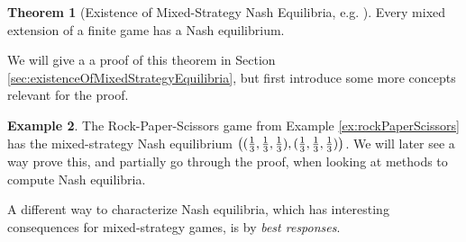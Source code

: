 \documentclass[a4paper,DIV=11]{scrreprt}
\theoremstyle{definition}
\newtheorem{thm}{Theorem}[chapter] %
\newtheorem{ex}[thm]{Example} %
\begin{document}
    \begin{thm}[Existence of Mixed-Strategy Nash Equilibria, e.g. {\cite[Section 1.3.1]{bib:fudenbergGameTheory}}]
        Every mixed extension of a finite game has a Nash equilibrium.
        \label{thm:existenceOfMixedStrategyEquilibria}
    \end{thm}
    We will give a a proof of this theorem in Section \ref{sec:existenceOfMixedStrategyEquilibria}, but first introduce some more concepts relevant for the proof.
    
    \begin{ex}
        The Rock-Paper-Scissors game from Example \ref{ex:rockPaperScissors}
        has the mixed-strategy Nash equilibrium $\bigl((\frac{1}{3}, \frac{1}{3}, \frac{1}{3}), (\frac{1}{3}, \frac{1}{3}, \frac{1}{3})\bigr)$.
        We will later see a way prove this, and partially go through the proof, when looking at methods to compute Nash equilibria.
    \end{ex}
    
    A different way to characterize Nash equilibria, which has interesting consequences for mixed-strategy games, is by \emph{best responses}.
    
\end{document}
